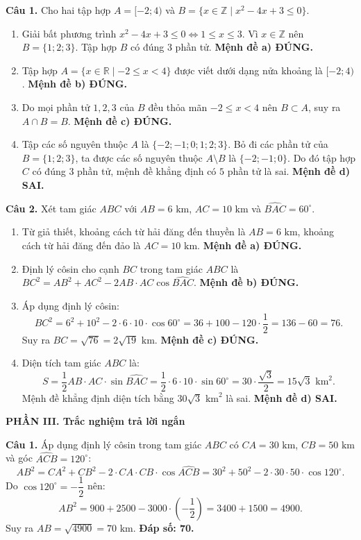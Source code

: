 \documentclass[12pt,a4paper]{article}
\begin{document}
\textbf{Câu 1.} Cho hai tập hợp $A = [-2; 4)$ và $B = \{x \in \mathbb{Z} \mid x^2 - 4x + 3 \le 0\}$.
\begin{enumerate}
    \item Giải bất phương trình $x^2 - 4x + 3 \le 0 \iff 1 \le x \le 3$. Vì $x \in \mathbb{Z}$ nên $B = \{1; 2; 3\}$. Tập hợp $B$ có đúng $3$ phần tử. \textbf{Mệnh đề a) ĐÚNG.}
    \item Tập hợp $A = \{x \in \mathbb{R} \mid -2 \le x < 4\}$ được viết dưới dạng nửa khoảng là $[-2; 4)$. \textbf{Mệnh đề b) ĐÚNG.}
    \item Do mọi phần tử $1, 2, 3$ của $B$ đều thỏa mãn $-2 \le x < 4$ nên $B \subset A$, suy ra $A \cap B = B$. \textbf{Mệnh đề c) ĐÚNG.}
    \item Tập các số nguyên thuộc $A$ là $\{-2; -1; 0; 1; 2; 3\}$. Bỏ đi các phần tử của $B = \{1; 2; 3\}$, ta được các số nguyên thuộc $A \setminus B$ là $\{-2; -1; 0\}$. Do đó tập hợp $C$ có đúng $3$ phần tử, mệnh đề khẳng định có $5$ phần tử là sai. \textbf{Mệnh đề d) SAI.}
\end{enumerate}

\textbf{Câu 2.} Xét tam giác $ABC$ với $AB = 6\text{ km}$, $AC = 10\text{ km}$ và $\widehat{BAC} = 60^\circ$.
\begin{enumerate}
    \item Từ giả thiết, khoảng cách từ hải đăng đến thuyền là $AB = 6\text{ km}$, khoảng cách từ hải đăng đến đảo là $AC = 10\text{ km}$. \textbf{Mệnh đề a) ĐÚNG.}
    \item Định lý côsin cho cạnh $BC$ trong tam giác $ABC$ là $BC^2 = AB^2 + AC^2 - 2 AB \cdot AC \cos \widehat{BAC}$. \textbf{Mệnh đề b) ĐÚNG.}
    \item Áp dụng định lý côsin:
    \[
    BC^2 = 6^2 + 10^2 - 2 \cdot 6 \cdot 10 \cdot \cos 60^\circ = 36 + 100 - 120 \cdot \frac{1}{2} = 136 - 60 = 76.
    \]
    Suy ra $BC = \sqrt{76} = 2\sqrt{19}\text{ km}$. \textbf{Mệnh đề c) ĐÚNG.}
    \item Diện tích tam giác $ABC$ là:
    \[
    S = \frac{1}{2} AB \cdot AC \cdot \sin \widehat{BAC} = \frac{1}{2} \cdot 6 \cdot 10 \cdot \sin 60^\circ = 30 \cdot \frac{\sqrt{3}}{2} = 15\sqrt{3}\text{ km}^2.
    \]
    Mệnh đề khẳng định diện tích bằng $30\sqrt{3}\text{ km}^2$ là sai. \textbf{Mệnh đề d) SAI.}
\end{enumerate}

\vspace{0.2cm}
\textbf{\large PHẦN III. Trắc nghiệm trả lời ngắn}

\textbf{Câu 1.} Áp dụng định lý côsin trong tam giác $ABC$ có $CA = 30\text{ km}$, $CB = 50\text{ km}$ và góc $\widehat{ACB} = 120^\circ$:
\[
AB^2 = CA^2 + CB^2 - 2 \cdot CA \cdot CB \cdot \cos \widehat{ACB} = 30^2 + 50^2 - 2 \cdot 30 \cdot 50 \cdot \cos 120^\circ.
\]
Do $\cos 120^\circ = -\dfrac{1}{2}$ nên:
\[
AB^2 = 900 + 2500 - 3000 \cdot \left(-\frac{1}{2}\right) = 3400 + 1500 = 4900.
\]
Suy ra $AB = \sqrt{4900} = 70\text{ km}$. \textbf{Đáp số: 70.}
\end{document}
